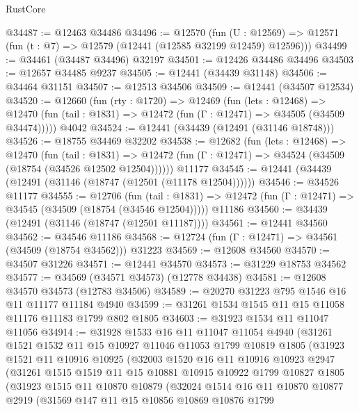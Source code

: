 \begin{lexlean}{RustCore}
\begin{coremodule}
@34487 := @12463 @34486
@34496 := @12570
    (fun (U : @12569) => @12571 (fun (t : @7) => @12579 (@12441 (@12585 @32199 @12459) @12596)))
@34499 := @34461 (@34487 @34496) @32197
@34501 := @12426 @34486 @34496
@34503 := @12657 @34485 @9237
@34505 := @12441 (@34439 @31148)
@34506 := @34464 @31151
@34507 := @12513 @34506
@34509 := @12441 (@34507 @12534)
@34520 := @12660
    (fun (rty : @1720) =>
    @12469
      (fun (lets : @12468) =>
      @12470 (fun (tail : @1831) => @12472 (fun (Γ : @12471) => @34505 (@34509 @34474)))))
    @4042
@34524 := @12441 (@34439 (@12491 (@31146 @18748)))
@34526 := @18755 @34469 @32202
@34538 := @12682
    (fun (lets : @12468) =>
    @12470
      (fun (tail : @1831) =>
      @12472 (fun (Γ : @12471) => @34524 (@34509 (@18754 (@34526 @12502 @12504))))))
    @11177
@34545 := @12441 (@34439 (@12491 (@31146 (@18747 (@12501 (@11178 @12504))))))
@34546 := @34526 @11177
@34555 := @12706
    (fun (tail : @1831) => @12472 (fun (Γ : @12471) => @34545 (@34509 (@18754 (@34546 @12504)))))
    @11186
@34560 := @34439 (@12491 (@31146 (@18747 (@12501 @11187))))
@34561 := @12441 @34560
@34562 := @34546 @11186
@34568 := @12724 (fun (Γ : @12471) => @34561 (@34509 (@18754 @34562))) @31223
@34569 := @12608 @34560
@34570 := @34507 @31226
@34571 := @12441 @34570
@34573 := @31229 @18753 @34562
@34577 := @34569 (@34571 @34573) (@12778 @34438)
@34581 := @12608 @34570 @34573 (@12783 @34506)
@34589 := @20270 @31223 @795 @1546 @16 @11 @11177 @11184 @4940
@34599 := @31261 @1534 @1545 @11 @15 @11058 @11176 @11183 @1799 @802 @1805
@34603 := @31923 @1534 @11 @11047 @11056
@34914 := @31928
    @1533
    @16
    @11
    @11047
    @11054
    @4940
    (@31261
      @1521
      @1532
      @11
      @15
      @10927
      @11046
      @11053
      @1799
      @10819
      @1805
      (@31923
        @1521
        @11
        @10916
        @10925
        (@32003
          @1520
          @16
          @11
          @10916
          @10923
          @2947
          (@31261
            @1515
            @1519
            @11
            @15
            @10881
            @10915
            @10922
            @1799
            @10827
            @1805
            (@31923
              @1515
              @11
              @10870
              @10879
              (@32024
                @1514
                @16
                @11
                @10870
                @10877
                @2919
                (@31569
                  @147
                  @11
                  @15
                  @10856
                  @10869
                  @10876
                  @1799

\end{coremodule}
\end{lexlean}
